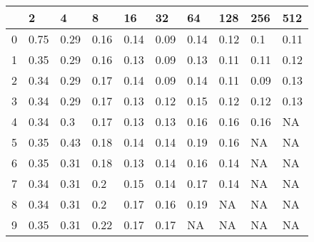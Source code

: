 \begin{tabular}{llllllllll}
\toprule
{} &   2   &   4   &   8   &   16  &   32  &   64  &   128 &   256 &   512 \\
\midrule
0 &  0.75 &  0.29 &  0.16 &  0.14 &  0.09 &  0.14 &  0.12 &   0.1 &  0.11 \\
1 &  0.35 &  0.29 &  0.16 &  0.13 &  0.09 &  0.13 &  0.11 &  0.11 &  0.12 \\
2 &  0.34 &  0.29 &  0.17 &  0.14 &  0.09 &  0.14 &  0.11 &  0.09 &  0.13 \\
3 &  0.34 &  0.29 &  0.17 &  0.13 &  0.12 &  0.15 &  0.12 &  0.12 &  0.13 \\
4 &  0.34 &   0.3 &  0.17 &  0.13 &  0.13 &  0.16 &  0.16 &  0.16 &    NA \\
5 &  0.35 &  0.43 &  0.18 &  0.14 &  0.14 &  0.19 &  0.16 &    NA &    NA \\
6 &  0.35 &  0.31 &  0.18 &  0.13 &  0.14 &  0.16 &  0.14 &    NA &    NA \\
7 &  0.34 &  0.31 &   0.2 &  0.15 &  0.14 &  0.17 &  0.14 &    NA &    NA \\
8 &  0.34 &  0.31 &   0.2 &  0.17 &  0.16 &  0.19 &    NA &    NA &    NA \\
9 &  0.35 &  0.31 &  0.22 &  0.17 &  0.17 &    NA &    NA &    NA &    NA \\
\bottomrule
\end{tabular}
